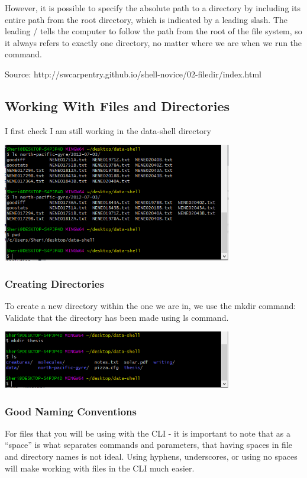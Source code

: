 \documentclass{article}
\begin{document}
However, it is possible to specify the absolute path to a directory by including its entire path from the root directory, which is indicated by a leading slash. The leading / tells the computer to follow the path from the root of the file system, so it always refers to exactly one directory, no matter where we are when we run the command.

Source: http://swcarpentry.github.io/shell-novice/02-filedir/index.html

\subsection{Working With Files and Directories}

I first check I am still working in the data-shell directory

\includegraphics[width=10cm]{Images/GitBash_012.PNG}


\subsubsection{Creating Directories}

To create a new directory within the one we are in, we use the mkdir command:
Validate that the directory has been made using ls command.

\includegraphics[width=10cm]{Images/GitBash_013.PNG}

\subsubsection{Good Naming Conventions}

For files that you will be using with the CLI - it is important to note that as a ``space'' is what separates commands and parameters, that having spaces in file and directory names is not ideal. Using hyphens, underscores, or using no spaces will make working with files in the CLI much easier.
\end{document}
